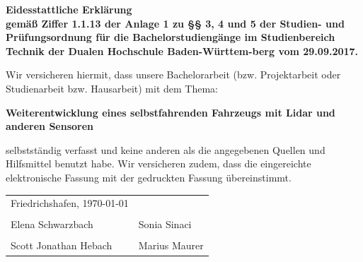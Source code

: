 \begin{flushleft}
	\Huge\bf Eidesstattliche Erklärung\\
	\vspace*{3cm}
	\normalsize\rm
	gemäß Ziffer 1.1.13 der Anlage 1 zu §§ 3, 4 und 5 der Studien- und Prüfungsordnung für die Bachelorstudiengänge im Studienbereich Technik der Dualen Hochschule Baden-Württem-berg vom 29.09.2017.
	\vspace{1cm}

	Wir versicheren hiermit, dass unsere Bachelorarbeit (bzw. Projektarbeit oder Studienarbeit bzw. Hausarbeit) mit dem Thema:
	\vspace{1cm}

	{\large \bf Weiterentwicklung eines selbstfahrenden Fahrzeugs mit Lidar und anderen Sensoren}

	\vspace{1cm}
	selbstständig verfasst und keine anderen als die angegebenen Quellen und Hilfsmittel benutzt habe. Wir versicheren zudem, dass die eingereichte elektronische Fassung mit der gedruckten Fassung übereinstimmt.\\
	\vfill
	\noindent

	\noindent
	\noindent
	\begin{tabular}{p{7cm} p{7cm}}
		Friedrichshafen, \today &               \\[1cm]
		\hrulefill              & \hrulefill    \\
		Elena Schwarzbach       & Sonia Sinaci  \\
		[1.5cm]
		\hrulefill              & \hrulefill    \\
		Scott Jonathan Hebach   & Marius Maurer \\
	\end{tabular}


\end{flushleft}